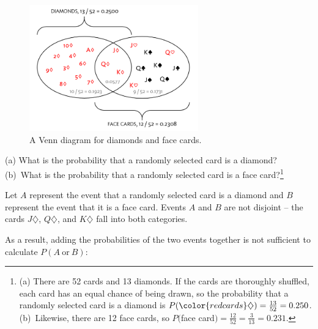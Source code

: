 \begin{figure}[h]
	\centering
	\includegraphics[width=0.65\textwidth]{ch_probability_oi_biostat/figures/cardsDiamondFaceVenn/cardsDiamondFaceVenn.png}
	\caption{A Venn diagram for diamonds and face cards.}
	\label{fig:cardsDiamondFaceVenn}
\end{figure}


\begin{exercise}
	(a) What is the probability that a randomly selected card is a diamond? (b)~What is the probability that a randomly selected card is a face card?\footnote{(a) There are 52 cards and 13 diamonds. If the cards are thoroughly shuffled, each card has an equal chance of being drawn, so the probability that a randomly selected card is a diamond is $P({\color{redcards}\diamondsuit}) = \frac{13}{52} = 0.250$. (b)~Likewise, there are 12 face cards, so $P($face card$) = \frac{12}{52} = \frac{3}{13} = 0.231$.}
\end{exercise}

Let $A$ represent the event that a randomly selected card is a diamond and $B$ represent the event that it is a face card. Events $A$ and $B$ are not disjoint -- the cards {\color{redcards}$J\diamondsuit$}, {\color{redcards}$Q\diamondsuit$}, and {\color{redcards}$K\diamondsuit$} fall into both categories. 

As a result, adding the probabilities of the two events together is not sufficient to calculate $P(A \ \text{or} \ B)$:

